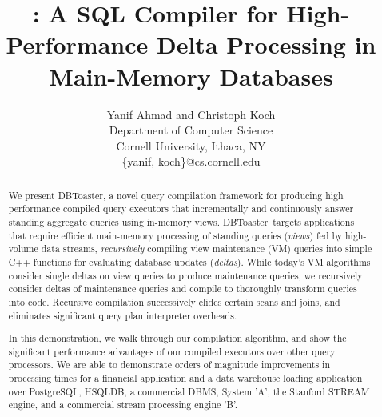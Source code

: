 \documentclass{vldb}
\title{\compiler: A SQL Compiler for High-Performance Delta Processing in
Main-Memory Databases}
\author{Yanif Ahmad and Christoph Koch \\
Department of Computer Science \\ Cornell University, Ithaca, NY \\
\{yanif, koch\}@cs.cornell.edu}
\date{}
\newcommand{\comment}[1]{}
\newcommand{\compiler}{DBToaster}
\begin{document}
\maketitle

\begin{abstract}
We present \compiler, a novel query compilation framework for producing high
performance compiled query executors that incrementally and continuously answer
standing aggregate queries using in-memory views. \compiler\ targets applications
that require efficient main-memory processing of standing queries
(\textit{views}) fed by high-volume data streams, \textit{recursively} compiling
view maintenance (VM) que\-ries into simple C++ functions for evaluating database
updates (\textit{deltas}).
While today's VM algorithms consider single deltas on view queries to produce
maintenance queries, we recursively consider deltas of maintenance queries and
compile to thoroughly transform queries into code. Recursive compilation
successively elides certain scans and joins, and eliminates significant query
plan interpreter overheads.
\comment{
Our compilation process models and implements group-by aggregates as
an associative map data structure, and obtains procedures to update these maps by
applying a set of map expression rewrites, which can then easily be turned into
C++ code.
}

In this demonstration, we walk through our compilation algorithm, and show the
significant performance advantages of our compiled executors over other query
processors. We are able to demonstrate orders of magnitude improvements in
processing times for a financial application and a data warehouse loading
application over PostgreSQL, HSQLDB, a commercial DBMS, System 'A', the Stanford
STREAM engine, and a commercial stream processing engine 'B'.
\end{abstract}









\end{document}
